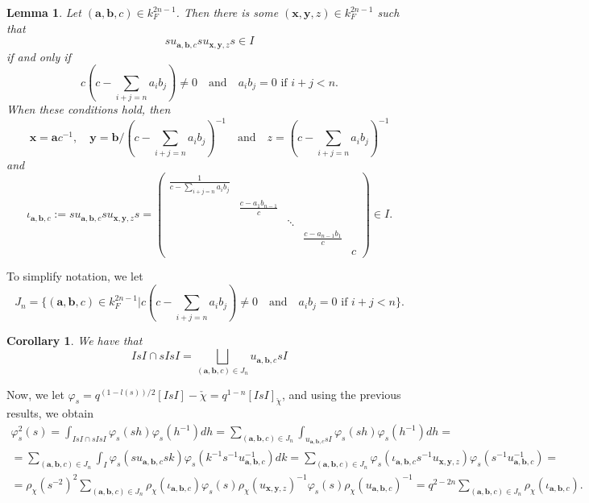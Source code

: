 \documentclass{article}
\theoremstyle{plain}
\newtheorem{lemma}[theorem]{Lemma}
\newtheorem{cor}[theorem]{Corollary}
\theoremstyle{definition}
\begin{document}
    \begin{lemma}
        Let $(\mathbf{a},\mathbf{b},c)\in k_F^{2n-1}$. Then there is some $(\mathbf{x},\mathbf{y},z)\in k_F^{2n-1}$ such that 
        $$su_{\mathbf{a},\mathbf{b},c}su_{\mathbf{x},\mathbf{y},z}s\in I$$
        if and only if 
        \begin{equation*}
        c(c-\sum_{i+j=n}a_ib_j)\neq0\quad\text{and}\quad a_ib_j=0 \text{  if  } i+j<n.
        \end{equation*}
        When these conditions hold, then 
        $$\mathbf{x}=\mathbf{a}c^{-1},\quad \mathbf{y}=\mathbf{b}/(c-\sum_{i+j=n}a_ib_j)^{-1}\quad\text{and}\quad z=(c-\sum_{i+j=n}a_ib_j)^{-1}$$
        and 
        $$\iota_{\mathbf{a},\mathbf{b},c}:=su_{\mathbf{a},\mathbf{b},c}su_{\mathbf{x},\mathbf{y},z}s=\begin{pmatrix}
            \frac{1}{c-\sum_{i+j=n}a_ib_j}&&&& \\
            &\frac{c-a_1b_{n-1}}{c}&&& \\
            &&\ddots&& \\
            &&&\frac{c-a_{n-1}b_1}{c}& \\
            &&&&c
        \end{pmatrix}\in I.$$
    \end{lemma}
    To simplify notation, we let $$J_n=\{(\mathbf{a},\mathbf{b},c)\in k_F^{2n-1}|c(c-\sum_{i+j=n}a_ib_j)\neq0\quad\text{and}\quad a_ib_j=0 \text{  if  } i+j<n\}.$$
    \begin{cor}
        We have that
        $$IsI\cap sIsI=\bigsqcup_{(\mathbf{a},\mathbf{b},c)\in J_n}u_{\mathbf{a},\mathbf{b},c}sI$$
    \end{cor}

    Now, we let $\varphi_s=q^{(1-l(s))/2}[IsI]-{\check{\chi}}=q^{1-n}[IsI]_{\check{\chi}}$, and using the previous results, we obtain
    \begin{align*}
        \varphi_s^2(s)=\int_{IsI\cap sIsI}\varphi_s(sh)\varphi_s(h^{-1})dh=\sum_{(\mathbf{a},\mathbf{b},c)\in J_n}\int_{u_{\mathbf{a},\mathbf{b},c}sI}\varphi_s(sh)\varphi_s(h^{-1})dh=\\
        =\sum_{(\mathbf{a},\mathbf{b},c)\in J_n}\int_{I}\varphi_s(su_{\mathbf{a},\mathbf{b},c}sk)\varphi_s(k^{-1}s^{-1}u_{\mathbf{a},\mathbf{b},c}^{-1})dk=\sum_{(\mathbf{a},\mathbf{b},c)\in J_n}\varphi_s(\iota_{\mathbf{a},\mathbf{b},c}s^{-1}u_{\mathbf{x},\mathbf{y},z})\varphi_s(s^{-1}u_{\mathbf{a},\mathbf{b},c}^{-1})=\\
        =\rho_\chi(s^{-2})^2\sum_{(\mathbf{a},\mathbf{b},c)\in J_n}\rho_\chi(\iota_{\mathbf{a},\mathbf{b},c})\varphi_s(s)\rho_\chi(u_{\mathbf{x},\mathbf{y},z})^{-1}\varphi_s(s)\rho_\chi(u_{\mathbf{a},\mathbf{b},c})^{-1}=q^{2-2n}\sum_{(\mathbf{a},\mathbf{b},c)\in J_n}\rho_\chi(\iota_{\mathbf{a},\mathbf{b},c}).
    \end{align*}
\end{document}
